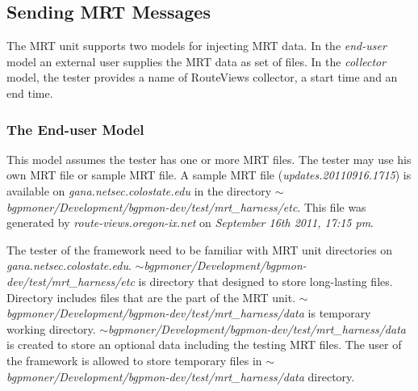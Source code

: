 \subsection{Sending MRT Messages}

The MRT unit supports two models for injecting MRT data. In the \emph{end-user} model an external user supplies the MRT data as set of files.   In the \emph{collector} model, the tester provides a name of  RouteViews collector, a start time and an end time. 

\subsubsection{The End-user Model}

This model assumes the tester has one or more MRT files.   The tester may use his own MRT file or sample MRT file.   A sample MRT file (\emph{updates.20110916.1715})  is available on \emph{gana.netsec.colostate.edu} in the directory \emph{$\sim$bgpmoner/Development/bgpmon-dev/test/mrt\_harness/etc}.  This file was generated by \emph{route-views.oregon-ix.net} on \emph{September 16th 2011, 17:15 pm}. 

The tester of the framework need to be familiar with MRT unit directories on \emph{gana.netsec.colostate.edu}. \emph{$\sim$bgpmoner/Development/bgpmon-dev/test/mrt\_harness/etc} is directory that designed to store long-lasting files. Directory includes files that are the part of the MRT unit.  \emph{$\sim$bgpmoner/Development/bgpmon-dev/test/mrt\_harness/data} is temporary working directory. \emph{$\sim$bgpmoner/Development/bgpmon-dev/test/mrt\_harness/data}  is created to   store an optional data including  the testing MRT files. The user of the framework is allowed to store temporary files in    \emph{$\sim$bgpmoner/Development/bgpmon-dev/test/mrt\_harness/data} directory.

 



